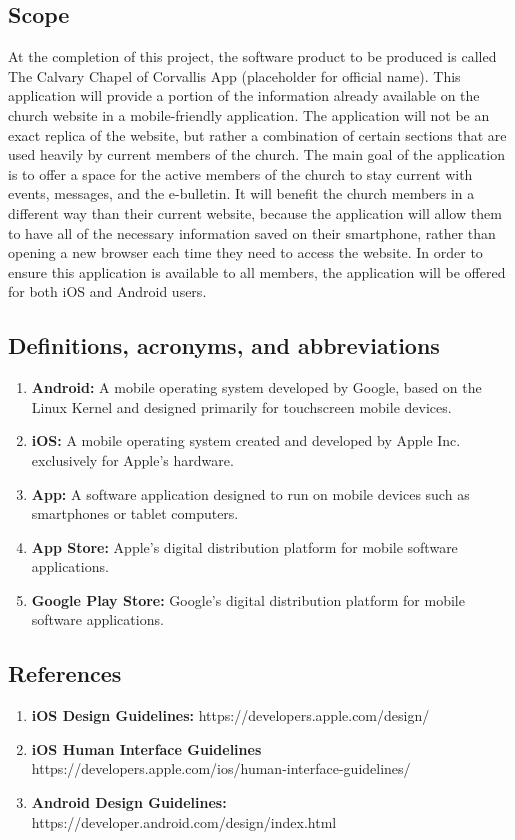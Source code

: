 \documentclass[letterpaper,10pt,draftclsnofoot,onecolumn,titlepage]{IEEEtran}
\begin{document}
	\subsection{Scope}
	At the completion of this project, the software product to be produced is called The Calvary Chapel of Corvallis App (placeholder for official name).
	This application will provide a portion of the information already available on the church website in a mobile-friendly application.
	The application will not be an exact replica of the website, but rather a combination of certain sections that are used heavily by current members of the church.
	The main goal of the application is to offer a space for the active members of the church to stay current with events, messages, and the e-bulletin.
	It will benefit the church members in a different way than their current website, because the application will allow them to have all of the necessary information saved on their smartphone, rather than opening a new browser each time they need to access the website.
	In order to ensure this application is available to all members, the application will be offered for both iOS and Android users.

	\subsection{Definitions, acronyms, and abbreviations}

	\begin{enumerate}
		\item \textbf{Android:} A mobile operating system developed by Google, based on the Linux Kernel and designed primarily for touchscreen mobile devices.
		\item \textbf{iOS:} A mobile operating system created and developed by Apple Inc. exclusively for Apple's hardware.
		\item \textbf{App:} A software application designed to run on mobile devices such as smartphones or tablet computers.
		\item \textbf{App Store:} Apple's digital distribution platform for mobile software applications.
		\item \textbf{Google Play Store:} Google's digital distribution platform for mobile software applications.
	\end{enumerate}

	\subsection{References}
	\begin{enumerate}
		\item \textbf{iOS Design Guidelines:} https://developers.apple.com/design/
		\item \textbf{iOS Human Interface Guidelines} https://developers.apple.com/ios/human-interface-guidelines/
		\item \textbf{Android Design Guidelines:} https://developer.android.com/design/index.html
	\end{enumerate}
\end{document}
